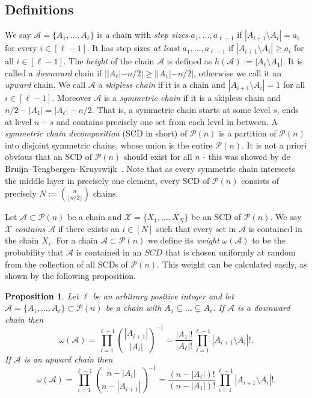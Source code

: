\documentclass[12pt]{article}
\newtheorem{prop}[theorem]{Proposition}
\numberwithin{equation}{section}
\def\A{\mathcal{A}}
\def\P{\mathcal{P}}
\def\X{\mathcal{X}}
\def\w{\omega}
\begin{document}
\subsection{Definitions}
We say $\A=\{A_1,\ldots,A_{\ell}\}$ is a chain with \emph{step sizes} $a_1,\ldots,a_{\ell -1}$ if $|A_{i+1}\setminus A_i|=a_i$ for every $i\in [\ell-1]$. It has step sizes \emph{at least} $a_1,\ldots,a_{\ell-1}$ if $|A_{i+1}\setminus A_i|\geq a_i$ for all $i\in [\ell-1]$. The \emph{height} of the chain $\A$ is defined as $h(\A):=|A_\ell\setminus A_1|$. It is called a \emph{downward} chain if  $||A_{\ell}|-n/2|\geq ||A_1|-n/2|$, otherwise we call it an \emph{upward} chain.
 We call $\A$ a \emph{skipless chain} if it is a chain and $|A_{i+1}\setminus A_i|=1$ for all $i\in[\ell -1]$. Moreover $\A$ is a \emph{symmetric chain} if it is a skipless chain and $n/2-|A_1|=|A_{\ell}|-n/2$. That is, a symmetric chain starts at some level $s$, ends at level $n-s$ and contains precisely one set from each level in between. A \emph{symmetric chain decomposition} (SCD in short) of $\P(n)$ is a partition of $\P(n)$ into disjoint symmetric chains, whose union is the entire $\P(n)$. It is not a priori obvious that an SCD of $\P(n)$ should exist for all $n$ - this was showed by de Bruijn--Tengbergen--Kruyswijk~\cite{scd}.  Note that as every symmetric chain intersects the middle layer in precisely one element, every SCD of $\P(n)$ consists of precisely $N:=\binom{n}{\lfloor n/2 \rfloor}$ chains.

Let $\A\subset \P(n)$ be a chain and $\X=\{X_1,\ldots,X_N\}$ be an SCD of $\P(n)$. We say $\X$ \emph{contains} $\A$ if there exists an $i\in [N]$ such that every set in $\A$ is contained in the chain $X_i$. For a chain $\A\subset \P(n)$ we define its \emph{weight} $\w(\A)$ to be the probability that $\A$ is contained in an $SCD$ that is chosen uniformly at random from the collection of all SCDs of $\P(n)$. This weight can be calculated easily, as shown by the following proposition.

\begin{prop}\label{weightformula}
Let $\ell$ be an arbitrary positive integer and let $\A=\{A_1,\ldots,A_{\ell}\}\subset \P(n)$ be a chain with $A_1\subsetneq \ldots \subsetneq A_{\ell}$. If $\A$ is a downward chain then 
$$\w(\A)=\prod_{i=1}^{\ell-1}\binom{|A_{i+1}|}{|A_i|}^{-1}=\frac{|A_1|!}{|A_{\ell}|!}\prod_{i=1}^{\ell -1}|A_{i+1}\setminus A_i|!.$$
If $\A$ is an upward chain then $$\w(\A)=\prod_{i=1}^{\ell-1}\binom{n-|A_{i}|}{n-|A_{i+1}|}^{-1} = \frac{(n-|A_{\ell}|)!}{(n-|A_1|)!}\prod_{i=1}^{\ell -1}|A_{i+1}\setminus A_i|!.$$
\end{prop}
\end{document}
